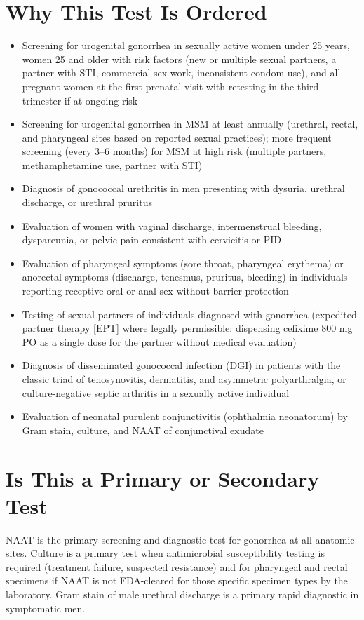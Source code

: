 \section*{Why This Test Is Ordered}
\begin{itemize}
  \item Screening for urogenital gonorrhea in sexually active women under 25 years, women 25 and older with risk factors (new or multiple sexual partners, a partner with STI, commercial sex work, inconsistent condom use), and all pregnant women at the first prenatal visit with retesting in the third trimester if at ongoing risk
  \item Screening for urogenital gonorrhea in MSM at least annually (urethral, rectal, and pharyngeal sites based on reported sexual practices); more frequent screening (every 3--6 months) for MSM at high risk (multiple partners, methamphetamine use, partner with STI)
  \item Diagnosis of gonococcal urethritis in men presenting with dysuria, urethral discharge, or urethral pruritus
  \item Evaluation of women with vaginal discharge, intermenstrual bleeding, dyspareunia, or pelvic pain consistent with cervicitis or PID
  \item Evaluation of pharyngeal symptoms (sore throat, pharyngeal erythema) or anorectal symptoms (discharge, tenesmus, pruritus, bleeding) in individuals reporting receptive oral or anal sex without barrier protection
  \item Testing of sexual partners of individuals diagnosed with gonorrhea (expedited partner therapy [EPT] where legally permissible: dispensing cefixime 800 mg PO as a single dose for the partner without medical evaluation)
  \item Diagnosis of disseminated gonococcal infection (DGI) in patients with the classic triad of tenosynovitis, dermatitis, and asymmetric polyarthralgia, or culture-negative septic arthritis in a sexually active individual
  \item Evaluation of neonatal purulent conjunctivitis (ophthalmia neonatorum) by Gram stain, culture, and NAAT of conjunctival exudate
\end{itemize}

\section*{Is This a Primary or Secondary Test}
NAAT is the primary screening and diagnostic test for gonorrhea at all anatomic sites. Culture is a primary test when antimicrobial susceptibility testing is required (treatment failure, suspected resistance) and for pharyngeal and rectal specimens if NAAT is not FDA-cleared for those specific specimen types by the laboratory. Gram stain of male urethral discharge is a primary rapid diagnostic in symptomatic men.

